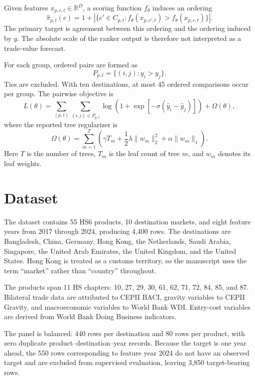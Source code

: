 \documentclass[conference]{IEEEtran}
\begin{document}
Given features $x_{p,c,t}\in\mathbb{R}^{D}$, a scoring function $f_\theta$ induces an ordering
\begin{equation}
\hat{\pi}_{p,t}(c)=1+\left|\{c'\in C_{p,t}:f_\theta(x_{p,c',t})>f_\theta(x_{p,c,t})\}\right|.
\end{equation}
The primary target is agreement between this ordering and the ordering induced by $y$. The absolute scale of the ranker output is therefore not interpreted as a trade-value forecast.

For each group, ordered pairs are formed as
\[
P_{p,t}=\{(i,j):y_i>y_j\}.
\]
Ties are excluded. With ten destinations, at most 45 ordered comparisons occur per group. The pairwise objective is
\begin{equation}
L(\theta)=
\sum_{(p,t)}\sum_{(i,j)\in P_{p,t}}
\log\left(1+\exp[-\sigma(\hat y_i-\hat y_j)]\right)
+\Omega(\theta),
\end{equation}
where the reported tree regularizer is
\begin{equation}
\Omega(\theta)=
\sum_{m=1}^{T}
\left(\gamma T_m+
\frac{1}{2}\lambda\|w_m\|_2^2+
\alpha\|w_m\|_1\right).
\end{equation}
Here $T$ is the number of trees, $T_m$ is the leaf count of tree $m$, and $w_m$ denotes its leaf weights.

\section{Dataset}

The dataset contains 55 HS6 products, 10 destination markets, and eight feature years from 2017 through 2024, producing 4,400 rows. The destinations are Bangladesh, China, Germany, Hong Kong, the Netherlands, Saudi Arabia, Singapore, the United Arab Emirates, the United Kingdom, and the United States. Hong Kong is treated as a customs territory, so the manuscript uses the term ``market'' rather than ``country'' throughout.

The products span 11 HS chapters: 10, 27, 29, 30, 61, 62, 71, 72, 84, 85, and 87. Bilateral trade data are attributed to CEPII BACI, gravity variables to CEPII Gravity, and macroeconomic variables to World Bank WDI. Entry-cost variables are derived from World Bank Doing Business indicators.

The panel is balanced: 440 rows per destination and 80 rows per product, with zero duplicate product--destination--year records. Because the target is one year ahead, the 550 rows corresponding to feature year 2024 do not have an observed target and are excluded from supervised evaluation, leaving 3,850 target-bearing rows.
\end{document}
